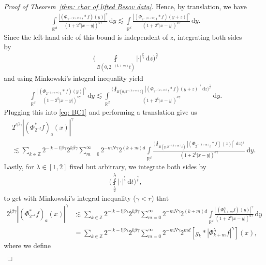\documentclass[11pt, leqno,parskip=half]{amsart}
\theoremstyle{definition}
\newcommand{\IR}{\mathbb{R}}
\newcommand{\IZ}{\mathbb{Z}}
\renewcommand{\d}{\mathrm{d}}
\numberwithin{equation}{section}
\begin{document}
\begin{proof}[Proof of Theorem~\ref{thm: char of lifted Besov data}]
Hence, by translation, we have
\begin{align*}
    \int\limits_{\IR^d} \frac{|(\Phi_{2^{-(k+m)}t}\ast f)(y)|^\gamma}{(1+2^k|x-y|)^{a\gamma}}\,\d y \lesssim \int\limits_{\IR^d} \frac{|(\Phi_{2^{-(k+m)}t}\ast f)(y+z)|^\gamma}{(1+2^k|x-y|)^{a\gamma}}\,\d y.
\end{align*}
Since the left-hand side of this bound is independent of $z$, integrating both sides by
\begin{align*}
    \bigg(\fint\limits_{B(0 ,2^{-(k+m)}t)} |\cdot |^\frac{r}{\gamma} \,\d z\bigg)^\frac{\gamma}{r}
\end{align*}
and using Minkowski's integral inequality yield
\begin{align*}
    \int\limits_{\IR^d} \frac{|(\Phi_{2^{-(k+m)}t}\ast f)(y)|^\gamma}{(1+2^k|x-y|)^{a\gamma}}\,\d y \lesssim \int\limits_{\IR^d} \frac{\Big(\fint_{B(0 ,2^{-(k+m)}t)} |(\Phi_{2^{-(k+m)}t}\ast f)(y+z) |^r \,\d z\Big)^\frac{\gamma}{r}}{(1+2^k|x-y|)^{a\gamma}}\,\d y.
\end{align*}
Plugging this into \eqref{eq: BC1} and performing a translation give us
\begin{align*}
    &2^{l\beta\gamma}|(\Phi_{2^{-l}}^*f)_a(x)|^\gamma\\
    &\lesssim \sum\limits_{k\in\IZ} 2^{-|k-l|\delta\gamma} 2^{k\beta\gamma } \sum\limits_{m=0}^\infty 2^{-mN\gamma} 2^{(k+m)d}\int\limits_{\IR^d} \frac{\Big(\fint_{B(y ,2^{-(k+m)}t)} |(\Phi_{2^{-(k+m)}t}\ast f)(z) |^r \,\d z\Big)^\frac{\gamma}{r}}{(1+2^k|x-y|)^{a\gamma}}\,\d y.
\end{align*}
Lastly, for $\lambda \in [1 , 2]$ fixed but arbitrary, we integrate both sides by
\begin{align*}
    \bigg(\fint\limits_{\frac{\lambda}{2}}^\lambda  |\cdot |^\frac{r}{\gamma} \, \d t\bigg)^\frac{\gamma}{r},
\end{align*}
to get with Minkowski's integral inequality ($\gamma <r$) that
\begin{align}
\label{eq: B1}
    2^{l\beta\gamma}|(\Phi_{2^{-l}}^*f)_a(x)|^\gamma &\lesssim \sum\limits_{k\in\IZ} 2^{-|k-l|\delta\gamma} 2^{k\beta\gamma} \sum\limits_{m=0}^\infty 2^{-mN\gamma} 2^{(k+m)d}\int\limits_{\IR^d} \frac{|(\Phi^\lambda_{k+m}f)(y)|^\gamma}{(1+2^k|x-y|)^{a\gamma}}\,\d y \nonumber\\
    &=\sum\limits_{k\in\IZ} 2^{-|k-l|\delta\gamma} 2^{k\beta\gamma} \sum\limits_{m=0}^\infty 2^{-mN\gamma} 2^{md} [g_k\ast |\Phi^\lambda_{k+m}f|^\gamma](x),
\end{align}
where we define
\begin{align*}

\end{align*}
\end{proof}
\end{document}
